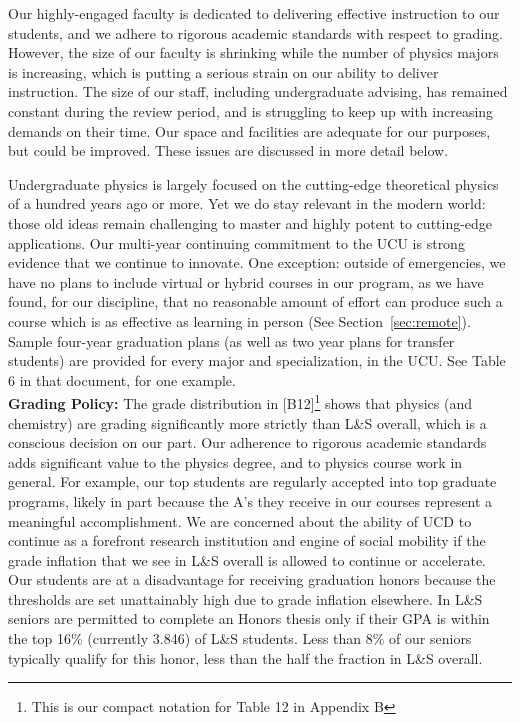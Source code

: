 \documentclass[12pt]{article}
\begin{document}
\noindent
Our highly-engaged faculty is dedicated to delivering effective instruction to our students, and we adhere to rigorous academic standards with respect to grading.  However, the size of our faculty is shrinking while the number of physics majors is increasing, which is putting a serious strain on our ability to deliver instruction.  The size of our staff, including undergraduate advising, has remained constant during the review period, and is struggling to keep up with increasing demands on their time.  Our space and facilities are adequate for our purposes, but could be improved.  These issues are discussed in more detail below.

Undergraduate physics is largely focused on the
cutting-edge theoretical physics of a hundred years ago or more.  Yet
we do stay relevant in the modern world: those old ideas remain
challenging to master and highly potent to cutting-edge applications.
Our multi-year continuing commitment to the UCU is strong evidence
that we continue to innovate.  One exception: outside of emergencies,
we have no plans to include virtual or hybrid courses in our program,
as we have found, for our discipline, that no reasonable amount of
effort can produce such a course which is as effective as learning in
person (See Section~\ref{sec:remote}).  Sample four-year graduation
plans (as well as two year plans for transfer students) are provided
for every major and specialization, in the UCU.  See Table 6 in that
document, for one example.\\[3pt]

\noindent
{\bf Grading Policy:} The grade distribution in [B12]\footnote{This is
  our compact notation for Table 12 in Appendix B} shows that physics
(and chemistry) are grading significantly more strictly than L\&S
overall, which is a conscious decision on our part.  Our adherence to
rigorous academic standards adds significant value to the physics
degree, and to physics course work in general.  For example, our top
students are regularly accepted into top graduate programs, likely in
part because the A's they receive in our courses represent a
meaningful accomplishment.  We are concerned about the ability of UCD
to continue as a forefront research institution and engine of social
mobility if the grade inflation that we see in L\&S overall is allowed
to continue or accelerate.  Our students are at a disadvantage for
receiving graduation honors because the thresholds are set
unattainably high due to grade inflation elsewhere.  In L\&S seniors
are permitted to complete an Honors thesis only if their GPA is within the top
16\% (currently 3.846) of L\&S students.  Less than 8\% of our seniors typically qualify for this honor, less than the half the fraction in L\&S overall.\\[3pt]
\end{document}
